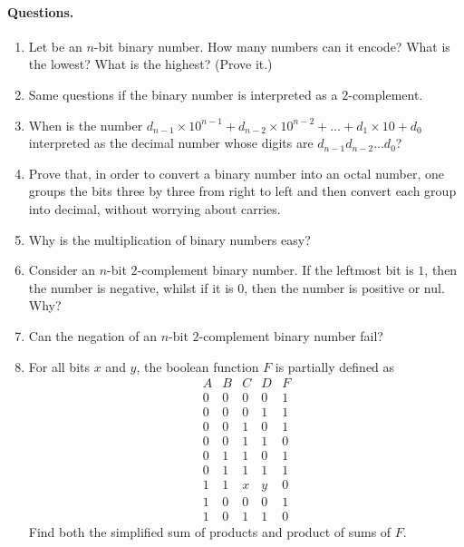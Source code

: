 \paragraph{Questions.}
\begin{enumerate}

  \item Let be an \(n\)-bit binary number. How many numbers can it
    encode? What is the lowest? What is the highest? (Prove it.) 

  \item Same questions if the binary number is interpreted as a
    \(2\)-complement.

  \item When is the number \(d_{n-1} \times 10^{n-1} + d_{n-2} \times
    10^{n-2} + \dots + d_1 \times 10 + d_0\) interpreted as the
    decimal number whose digits are \(d_{n-1}d_{n-2} \dots d_0\)?

  \item Prove that, in order to convert a binary number into an octal
    number, one groups the bits three by three from right to left and
    then convert each group into decimal, without worrying about
    carries.

  \item Why is the multiplication of binary numbers easy?

  \item Consider an \(n\)-bit \(2\)-complement binary number. If the
    leftmost bit is \(1\), then the number is negative, whilst if it
    is \(0\), then the number is positive or nul. Why?

  \item Can the negation of an \(n\)-bit \(2\)-complement binary
    number fail?

  \item For all bits \(x\) and \(y\), the boolean function \(F\) is
    partially defined as
\[
\begin{array}{c|c|c|c||c}
  A & B & C & D & F\\
\hline
  0 & 0 & 0 & 0 & 1\\
  0 & 0 & 0 & 1 & 1\\
  0 & 0 & 1 & 0 & 1\\
  0 & 0 & 1 & 1 & 0\\
  0 & 1 & 1 & 0 & 1\\
  0 & 1 & 1 & 1 & 1\\
  1 & 1 & x & y & 0\\
  1 & 0 & 0 & 0 & 1\\
  1 & 0 & 1 & 1 & 0
\end{array}
\]
Find both the simplified sum of products and product of sums of \(F\).

\end{enumerate}
